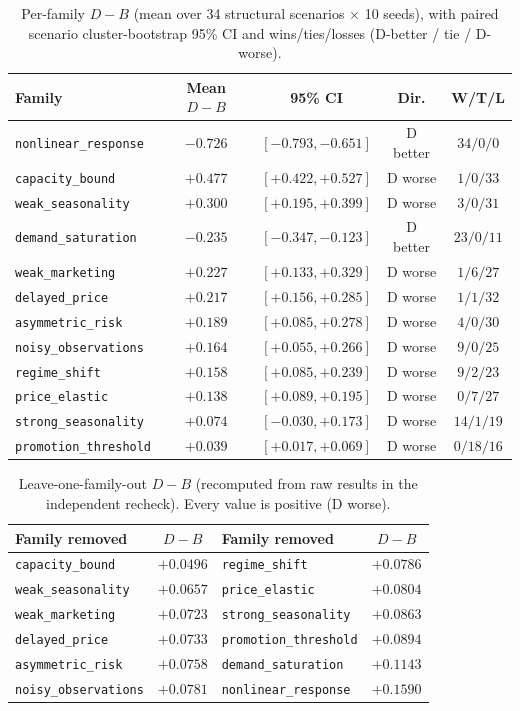 \documentclass[10pt,twocolumn,a4paper]{article}
\newcommand{\code}[1]{\texttt{#1}}
\newcommand{\dvb}{\ensuremath{D\!-\!B}}
\begin{document}
\begin{table}[tbp]
\caption{Per-family $\dvb$ (mean over 34 structural scenarios $\times$ 10 seeds),
with paired scenario cluster-bootstrap 95\% CI and wins/ties/losses
(D-better / tie / D-worse).}
\label{tab:family}
\centering
\small
\begin{tabular}{lcccc}
\toprule
Family & Mean \dvb & 95\% CI & Dir. & W/T/L \\
\midrule
\code{nonlinear\_response}  & $-0.726$ & $[-0.793,-0.651]$ & D better & $34/0/0$ \\
\code{capacity\_bound}      & $+0.477$ & $[+0.422,+0.527]$ & D worse  & $1/0/33$ \\
\code{weak\_seasonality}    & $+0.300$ & $[+0.195,+0.399]$ & D worse  & $3/0/31$ \\
\code{demand\_saturation}   & $-0.235$ & $[-0.347,-0.123]$ & D better & $23/0/11$ \\
\code{weak\_marketing}      & $+0.227$ & $[+0.133,+0.329]$ & D worse  & $1/6/27$ \\
\code{delayed\_price}       & $+0.217$ & $[+0.156,+0.285]$ & D worse  & $1/1/32$ \\
\code{asymmetric\_risk}     & $+0.189$ & $[+0.085,+0.278]$ & D worse  & $4/0/30$ \\
\code{noisy\_observations}  & $+0.164$ & $[+0.055,+0.266]$ & D worse  & $9/0/25$ \\
\code{regime\_shift}        & $+0.158$ & $[+0.085,+0.239]$ & D worse  & $9/2/23$ \\
\code{price\_elastic}       & $+0.138$ & $[+0.089,+0.195]$ & D worse  & $0/7/27$ \\
\code{strong\_seasonality}  & $+0.074$ & $[-0.030,+0.173]$ & D worse  & $14/1/19$ \\
\code{promotion\_threshold} & $+0.039$ & $[+0.017,+0.069]$ & D worse  & $0/18/16$ \\
\bottomrule
\end{tabular}
\end{table}

\begin{table}[tbp]
\caption{Leave-one-family-out $\dvb$ (recomputed from raw results in the
independent recheck). Every value is positive (D worse).}
\label{tab:lofo}
\centering
\small
\begin{tabular}{lc|lc}
\toprule
Family removed & \dvb & Family removed & \dvb \\
\midrule
\code{capacity\_bound}     & $+0.0496$ & \code{regime\_shift}      & $+0.0786$ \\
\code{weak\_seasonality}   & $+0.0657$ & \code{price\_elastic}     & $+0.0804$ \\
\code{weak\_marketing}     & $+0.0723$ & \code{strong\_seasonality}& $+0.0863$ \\
\code{delayed\_price}      & $+0.0733$ & \code{promotion\_threshold}& $+0.0894$ \\
\code{asymmetric\_risk}    & $+0.0758$ & \code{demand\_saturation} & $+0.1143$ \\
\code{noisy\_observations} & $+0.0781$ & \code{nonlinear\_response}& $+0.1590$ \\
\bottomrule
\end{tabular}
\end{table}
\end{document}
